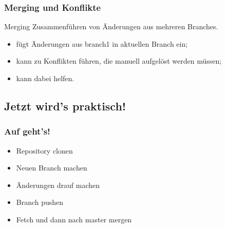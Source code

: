 \documentclass{cms-kurs}
\begin{document}
\begin{frame}
  \frametitle{Merging und Konflikte}

  \onslide<+->

  \begin{block}{Merging}
    Zusammenführen von Änderungen aus mehreren Branches.
  \end{block}

  \onslide<+->

  \begin{itemize}
  \item {} fügt Änderungen aus branch1 in aktuellen Branch
    ein;
  \item kann zu Konflikten führen, die manuell aufgelöst werden müssen;
  \item {} kann dabei helfen.
  \end{itemize}

\end{frame}

\subsection{Jetzt wird's praktisch!}

\begin{frame}
  \frametitle{Auf geht's!}

  \onslide<+->

  \begin{itemize}
  \item Repository clonen
  \item Neuen Branch machen
  \item Änderungen drauf machen
  \item Branch pushen
  \item Fetch und dann nach master mergen
  \end{itemize}
\end{frame}
\end{document}
